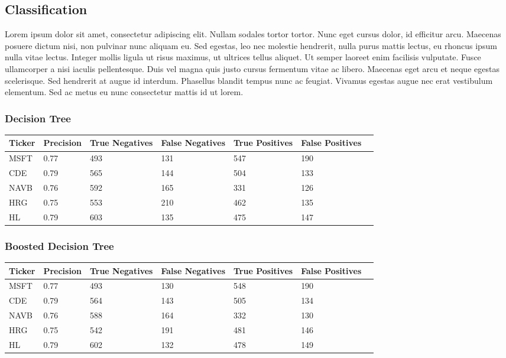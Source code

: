 \subsection{Classification}
Lorem ipsum dolor sit amet, consectetur adipiscing elit. Nullam sodales tortor tortor. Nunc eget cursus dolor, id efficitur arcu. Maecenas posuere dictum nisi, non pulvinar nunc aliquam eu. Sed egestas, leo nec molestie hendrerit, nulla purus mattis lectus, eu rhoncus ipsum nulla vitae lectus. Integer mollis ligula ut risus maximus, ut ultrices tellus aliquet. Ut semper laoreet enim facilisis vulputate. Fusce ullamcorper a nisi iaculis pellentesque. Duis vel magna quis justo cursus fermentum vitae ac libero. Maecenas eget arcu et neque egestas scelerisque. Sed hendrerit at augue id interdum. Phasellus blandit tempus nunc ac feugiat. Vivamus egestas augue nec erat vestibulum elementum. Sed ac metus eu nunc consectetur mattis id ut lorem.

\subsubsection{Decision Tree}

\begin{center}
    \begin{tabular}{ | l | l | l | | l | l | l | p{5cm} |}
    \hline
    Ticker & Precision & True Negatives & False Negatives & True Positives & False Positives \\ \hline
    MSFT & 0.77 & 493 & 131 & 547 & 190 \\ \hline
    CDE & 0.79 & 565 & 144 & 504 & 133 \\ \hline
    NAVB & 0.76 & 592 & 165 & 331 & 126 \\ \hline
    HRG & 0.75 & 553 & 210 & 462 & 135 \\ \hline
    HL & 0.79 & 603 & 135 & 475 & 147 \\
    \hline
    \end{tabular}
\end{center}

\subsubsection{Boosted Decision Tree}

\begin{center}
    \begin{tabular}{ | l | l | l | | l | l | l | p{5cm} |}
    \hline
    Ticker & Precision & True Negatives & False Negatives & True Positives & False Positives \\ \hline
    MSFT & 0.77 & 493 & 130 & 548 & 190 \\ \hline
    CDE & 0.79 & 564 & 143 & 505 & 134 \\ \hline
    NAVB & 0.76 & 588 & 164 & 332 & 130 \\ \hline
    HRG & 0.75 & 542 & 191 & 481 & 146 \\ \hline
    HL & 0.79 & 602 & 132 & 478 & 149 \\
    \hline
    \end{tabular}
\end{center}

